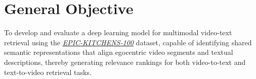 \section{General Objective}

To develop and evaluate a deep learning model for multimodal video-text retrieval using the \href{https://epic-kitchens.github.io/}{\textit{EPIC-KITCHENS-100}} dataset, capable of identifying shared semantic representations that align egocentric video segments and textual descriptions, thereby generating relevance rankings for both video-to-text and text-to-video retrieval tasks.
